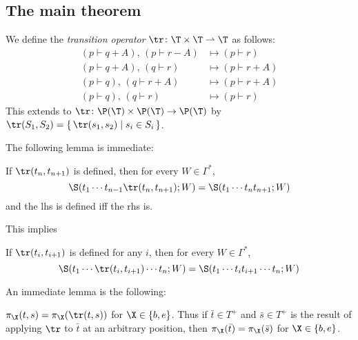 \documentclass{llncs}
\begin{document}
\subsection{The main theorem}

We define the \emph{transition operator} $\tr\colon\T\times\T\partial\T$ as follows:
\begin{align*}
    (p\vdash q+ A),\,(p\vdash r- A) &\mapsto (p\vdash r)\\
    (p\vdash q+ A),\,(q\vdash r) &\mapsto (p\vdash r+ A)\\
    (p\vdash q),\,(q\vdash r+ A) &\mapsto (p\vdash r+ A)\\
    (p\vdash q),\,(q\vdash r) &\mapsto (p\vdash r)
\end{align*}
This extends to $\tr\colon\P(\T)\times\P(\T)\to\P(\T)$ by $\tr(S_1,S_2)=\set{\tr(s_1,s_2)}[s_i\in S_i]$.

The following lemma is immediate:

\begin{lemma}

    If $\tr(t_n,t_{n+1})$ is defined, then for every $W\in\Gamma^*$,
    $$ \S(t_1\cdots t_{n-1}\tr(t_n,t_{n+1});W) = \S(t_1\cdots t_nt_{n+1}; W) $$
    and the lhs is defined iff the rhs is.

\end{lemma}

This implies

\begin{lemma}

    If $\tr(t_i,t_{i+1})$ is defined for any $i$, then for every $W\in\Gamma^*$,
    $$ \S(t_1\cdots \tr(t_i,t_{i+1})\cdots t_n; W) = \S(t_1\cdots t_it_{i+1}\cdots t_n;W) $$

\end{lemma}

An immediate lemma is the following:

\begin{lemma}

    $\pi_\X(t,s)=\pi_\X(\tr(t,s))$ for $\X\in\set{b,e}$.
    Thus if $\bar t\in T^+$ and $\bar s\in T^+$ is the result of applying $\tr$ to $\bar t$ at an arbitrary position, then $\pi_\X(\bar t)=\pi_\X(\bar s)$ for $\X\in\set{b,e}$.

\end{lemma}
\end{document}
